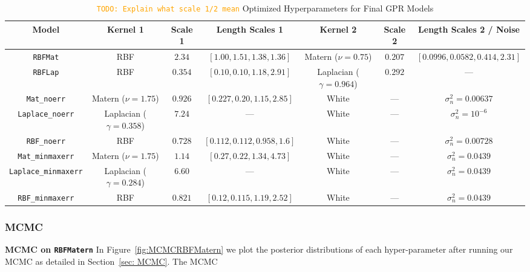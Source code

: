 \documentclass[10pt]{article}
\newcommand{\todo}[1]{\textcolor{orange}{\texttt{TODO: #1}}}
\begin{document}
\begin{table}[H]
\centering
\caption{\todo{Explain what scale 1/2 mean} Optimized Hyperparameters for Final GPR Models}
\footnotesize  %
\renewcommand{\arraystretch}{1.15}  %
\setlength{\tabcolsep}{4pt}  %
\label{tab:final_gpr_hyperparams}
{\fontsize{7}{9.5}\selectfont
\begin{tabular}{|c|c|c|c|c|c|c|}
\hline
\textbf{Model} & \textbf{Kernel 1} & \textbf{Scale 1} & \textbf{Length Scales 1} & \textbf{Kernel 2} & \textbf{Scale 2} & \textbf{Length Scales 2 / Noise} \\
\hline
\texttt{RBFMat} & RBF & $2.34$ & $[1.00, 1.51, 1.38, 1.36]$ & Matern ($\nu = 0.75$) & $0.207$ & $[0.0996, 0.0582, 0.414, 2.31]$ \\
\texttt{RBFLap} & RBF & $0.354$ & $[0.10, 0.10, 1.18, 2.91]$ & Laplacian ($\gamma = 0.964$) & $0.292$ & --- \\
\texttt{Mat\_noerr} & Matern ($\nu = 1.75$) & $0.926$ & $[0.227, 0.20, 1.15, 2.85]$ & White & --- & $\sigma_n^2 = 0.00637$ \\
\texttt{Laplace\_noerr} & Laplacian ($\gamma = 0.358$) & $7.24$ & --- & White & --- & $\sigma_n^2 = 10^{-6}$ \\
\texttt{RBF\_noerr} & RBF & $0.728$ & $[0.112, 0.112, 0.958, 1.6]$ & White & --- & $\sigma_n^2 = 0.00728$ \\
\texttt{Mat\_minmaxerr} & Matern ($\nu = 1.75$) & $1.14$ & $[0.27, 0.22, 1.34, 4.73]$ & White & --- & $\sigma_n^2 = 0.0439$ \\
\texttt{Laplace\_minmaxerr} & Laplacian ($\gamma = 0.284$) & $6.60$ & --- & White & --- & $\sigma_n^2 = 0.0439$ \\
\texttt{RBF\_minmaxerr} & RBF & $0.821$ & $[0.12, 0.115, 1.19, 2.52]$ & White & --- & $\sigma_n^2 = 0.0439$ \\
\hline
\end{tabular}}
\end{table}

\subsubsection{MCMC}
\textbf{MCMC on \texttt{RBFMatern}}
In Figure~\ref{fig:MCMCRBFMatern} we plot the posterior distributions of each hyper-parameter after running our MCMC as detailed in Section~\ref{sec: MCMC}.
The MCMC 
\end{document}
